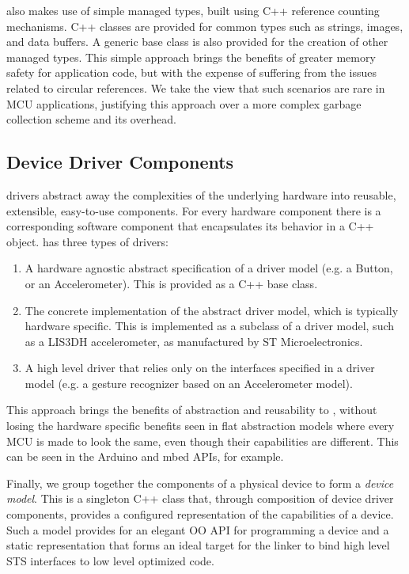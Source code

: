 \CO also makes use of simple managed types, built using C++ reference counting mechanisms. C++ classes are provided for common types such as strings, images, and data buffers. A generic base class is also provided for the creation of other managed types. This simple approach brings the benefits of greater memory safety for application code, but with the expense of suffering from the issues related to circular references. We take the view that such scenarios are rare in MCU applications, justifying this approach over a more complex garbage collection scheme and its overhead.

\subsection{Device Driver Components}
\CO drivers abstract away the complexities of the underlying hardware into reusable, extensible, easy-to-use components. For every hardware component there is a corresponding software component that encapsulates its behavior in a C++ object. \CO has three types of drivers:
\begin{enumerate}
    \item A hardware agnostic abstract specification of a driver model (e.g. a Button, or an Accelerometer). This is provided as a C++ base class.
    \item The concrete implementation of the abstract driver model, which is typically hardware specific. This is implemented as a subclass of a driver model, such as a LIS3DH accelerometer, as manufactured by ST Microelectronics.
    \item A high level driver that relies only on the interfaces specified in a driver model (e.g. a gesture recognizer based on an Accelerometer model).
\end{enumerate}

This approach brings the benefits of abstraction and re\-usability to \CON, without losing the hardware specific benefits seen in flat abstraction models where every MCU is made to look the same, even though their capabilities are different. This can be seen in the Arduino and mbed APIs, for example.

Finally, we group together the components of a physical device to form a \emph{device model}. This is a singleton C++ class that, through composition of device driver components, provides a configured representation of the capabilities of a device. Such a model provides for an elegant OO API for programming a device and a static representation that forms an ideal target for the \MC linker to bind high level STS interfaces to low level optimized code.

